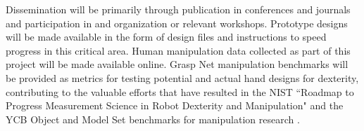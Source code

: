 \smallskip{} 
 Dissemination will be primarily through publication in conferences and journals and participation in and organization or relevant workshops.    Prototype designs will be made available in the form of design files and instructions to speed progress in this critical area.   Human manipulation data collected as part of this project will be made available online.   Grasp Net manipulation benchmarks will be provided as metrics for testing potential and actual hand designs for dexterity, contributing to the valuable efforts that have resulted in the NIST ``Roadmap to Progress Measurement Science in Robot Dexterity and Manipulation" \cite{falco2014roadmap} and the YCB Object and Model Set benchmarks for manipulation research \cite{calli2015ycb}.

